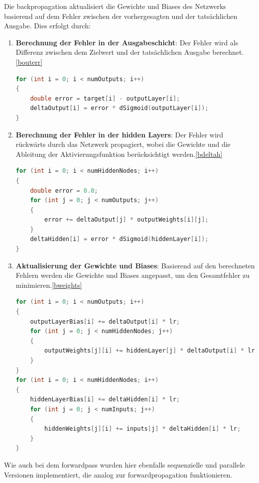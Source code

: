 \documentclass[a4paper, 12pt]{article}
\begin{document}
Die backpropagation aktualisiert die Gewichte und Biases des Netzwerks basierend auf dem Fehler zwischen der vorhergesagten und der tatsächlichen Ausgabe.
Dies erfolgt durch:

\begin{enumerate}
    \item \textbf{Berechnung der Fehler in der Ausgabeschicht}: Der Fehler wird als Differenz zwischen dem Zielwert und der tatsächlichen Ausgabe berechnet.\ref{bouterr}
    \begin{lstlisting}[language=C, caption={backpropagation outputerr}, label={bouterr}]
for (int i = 0; i < numOutputs; i++)
{
    double error = target[i] - outputLayer[i];
    deltaOutput[i] = error * dSigmoid(outputLayer[i]);
}
    \end{lstlisting}
    
    \item \textbf{Berechnung der Fehler in der hidden Layers}: Der Fehler wird rückwärts durch das Netzwerk propagiert, wobei die Gewichte und die Ableitung der Aktivierungsfunktion berücksichtigt werden.\ref{bdeltah}
    \begin{lstlisting}[language=C, caption={backpropagation deltaHidden}, label={bdeltah}]
for (int i = 0; i < numHiddenNodes; i++)
{
    double error = 0.0;
    for (int j = 0; j < numOutputs; j++)
    {
        error += deltaOutput[j] * outputWeights[i][j];
    }
    deltaHidden[i] = error * dSigmoid(hiddenLayer[i]);
}
    \end{lstlisting}

    \item \textbf{Aktualisierung der Gewichte und Biases}: Basierend auf den berechneten Fehlern werden die Gewichte und Biases angepasst, um den Gesamtfehler zu minimieren.\ref{bweights}
    \begin{lstlisting}[language=C, caption={backpropagation weights}, label={bweights}]
for (int i = 0; i < numOutputs; i++)
{
    outputLayerBias[i] += deltaOutput[i] * lr;
    for (int j = 0; j < numHiddenNodes; j++)
    {
        outputWeights[j][i] += hiddenLayer[j] * deltaOutput[i] * lr;
    }
}
for (int i = 0; i < numHiddenNodes; i++)
{
    hiddenLayerBias[i] += deltaHidden[i] * lr;
    for (int j = 0; j < numInputs; j++)
    {
        hiddenWeights[j][i] += inputs[j] * deltaHidden[i] * lr;
    }
}
    \end{lstlisting}

\end{enumerate}

Wie auch bei dem forwardpass wurden hier ebenfalls sequenzielle und parallele Versionen implementiert, die analog zur forwardpropagation funktionieren.
\end{document}
